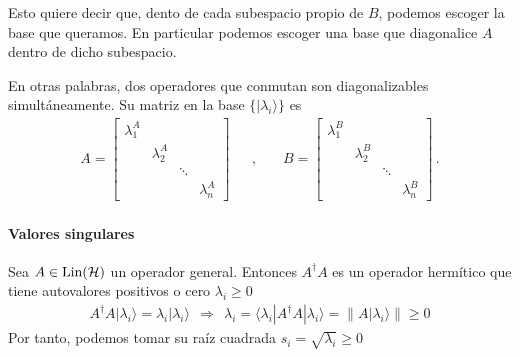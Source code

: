 \documentclass[letterpaper,10pt,english]{jupyterBook}
\newcommand{\bra}[1]{\langle #1|}
\newcommand{\ket}[1]{|#1\rangle}
\newcommand{\Hil}{{\cal H}}
\newcommand{\Lin}{\hbox{Lin}}
\begin{document}
\sphinxAtStartPar
Esto quiere decir que, dento de cada subespacio propio de \(B\), podemos escoger la base que queramos. En particular podemos escoger una base que diagonalice \(A\) dentro de dicho subespacio.

\sphinxAtStartPar
En otras palabras, dos operadores que conmutan son diagonalizables simultáneamente. Su matriz en la base \(\{\ket{\lambda_i}\}\) es
\begin{equation*}
\begin{split}
A = \begin{bmatrix} \lambda^A_1 & & &  \\ & \lambda^A_2 & &   \\ & & \ddots &  \\ & & & \lambda^A_n 
\end{bmatrix}~~~~~~~,~~~~~~~~
B = \begin{bmatrix} \lambda^B_1 & & &  \\ & \lambda^B_2 & &   \\ & & \ddots &  \\ & & & \lambda^B_n 
\end{bmatrix}\, .
\end{split}
\end{equation*}

\paragraph{Valores singulares}
\label{\detokenize{docs/Part_01_Formalismo/Chapter_01_02_Formalismo_matem_xe1tico/01_03_Operadores_myst:valores-singulares}}
\sphinxAtStartPar
Sea \(A\in \Lin(\Hil)\) un operador general. Entonces \(A^\dagger A\) es un operador hermítico que tiene autovalores positivos o cero \(\lambda_i\geq 0\)
\begin{equation*}
\begin{split}
A^\dagger A\ket{\lambda_i} = \lambda_i\ket{\lambda_i} ~~\Rightarrow ~~\lambda_i = \bra{\lambda_i} A^\dagger A\ket{\lambda_i} =\| A\ket{\lambda_i} \| \geq 0
\end{split}
\end{equation*}
\sphinxAtStartPar
Por tanto, podemos tomar su raíz cuadrada \(s_i = \sqrt{\lambda_i} \geq 0\)
\end{document}
